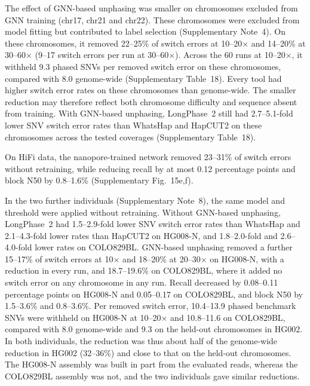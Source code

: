 \documentclass[11pt,a4paper]{article}
\newcommand{\toolname}{LongPhase~2\xspace}
\newcommand{\whatshap}{WhatsHap\xspace}
\newcommand{\hapcut}{HapCUT2\xspace}
\begin{document}
The effect of GNN-based unphasing was smaller on chromosomes excluded from GNN training (chr17, chr21 and chr22). These chromosomes were excluded from model fitting but contributed to label selection (Supplementary Note~4). On these chromosomes, it removed 22--25\% of switch errors at 10--20$\times$ and 14--20\% at 30--60$\times$ (9--17 switch errors per run at 30--60$\times$). Across the 60 runs at 10--20$\times$, it withheld 9.3 phased SNVs per removed switch error on these chromosomes, compared with 8.0 genome-wide (Supplementary Table~18). Every tool had higher switch error rates on these chromosomes than genome-wide. The smaller reduction may therefore reflect both chromosome difficulty and sequence absent from training. With GNN-based unphasing, \toolname still had 2.7--5.1-fold lower SNV switch error rates than \whatshap and \hapcut on these chromosomes across the tested coverages (Supplementary Table~18).

On HiFi data, the nanopore-trained network removed 23--31\% of switch errors without retraining, while reducing recall by at most 0.12 percentage points and block N50 by 0.8--1.6\% (Supplementary Fig.~15e,f).

In the two further individuals (Supplementary Note~8), the same model and threshold were applied without retraining. Without GNN-based unphasing, \toolname had 1.5--2.9-fold lower SNV switch error rates than \whatshap and 2.1--4.3-fold lower rates than \hapcut on HG008-N, and 1.8--2.0-fold and 2.6--4.0-fold lower rates on COLO829BL. GNN-based unphasing removed a further 15--17\% of switch errors at 10$\times$ and 18--20\% at 20--30$\times$ on HG008-N, with a reduction in every run, and 18.7--19.6\% on COLO829BL, where it added no switch error on any chromosome in any run. Recall decreased by 0.08--0.11 percentage points on HG008-N and 0.05--0.17 on COLO829BL, and block N50 by 1.5--3.6\% and 0.8--3.6\%. Per removed switch error, 10.4--13.9 phased benchmark SNVs were withheld on HG008-N at 10--20$\times$ and 10.8--11.6 on COLO829BL, compared with 8.0 genome-wide and 9.3 on the held-out chromosomes in HG002. In both individuals, the reduction was thus about half of the genome-wide reduction in HG002 (32--36\%) and close to that on the held-out chromosomes. The HG008-N assembly was built in part from the evaluated reads, whereas the COLO829BL assembly was not, and the two individuals gave similar reductions.
\end{document}
